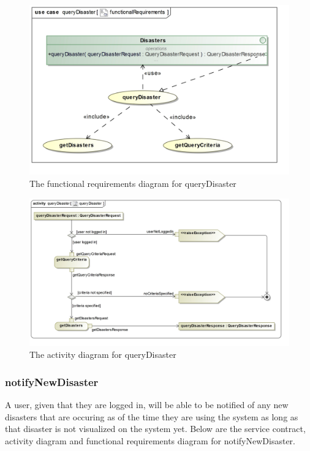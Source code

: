 \begin{figure}[H]
	\centering
	\includegraphics[width=1.2\textwidth]{../images/funcReq/queryDisasterFunctionalRequirements.jpg}
	\caption{The functional requirements diagram for queryDisaster \label{overflow}}
\end{figure}

\begin{figure}[H]
	\centering
	\includegraphics[scale=0.2]{../images/funcReq/queryDisasterActivityDiagram.jpg}
	\caption{The activity diagram for queryDisaster \label{overflow}}
\end{figure} 

\subsubsection{notifyNewDisaster}

A user, given that they are logged in, will be able to be notified of any new disasters that are occuring as of the time they are using the system as long as that disaster is not visualized on the system yet. Below are the service contract, activity diagram and functional requirements diagram for notifyNewDisaster.

